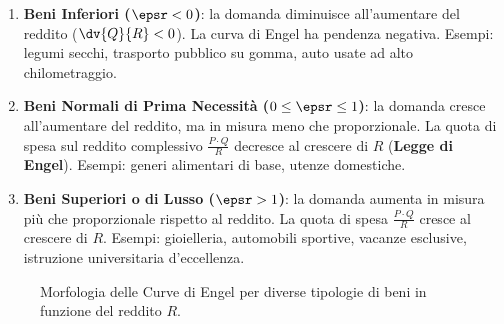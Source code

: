 \begin{enumerate}
    \item \textbf{Beni Inferiori ($\epsr < 0$)}: la domanda diminuisce all'aumentare del reddito ($\dv{Q}{R} < 0$). La curva di Engel ha pendenza negativa. Esempi: legumi secchi, trasporto pubblico su gomma, auto usate ad alto chilometraggio.
    \item \textbf{Beni Normali di Prima Necessità ($0 \le \epsr \le 1$)}: la domanda cresce all'aumentare del reddito, ma in misura meno che proporzionale. La quota di spesa sul reddito complessivo $\frac{P \cdot Q}{R}$ decresce al crescere di $R$ (\textbf{Legge di Engel}). Esempi: generi alimentari di base, utenze domestiche.
    \item \textbf{Beni Superiori o di Lusso ($\epsr > 1$)}: la domanda aumenta in misura più che proporzionale rispetto al reddito. La quota di spesa $\frac{P \cdot Q}{R}$ cresce al crescere di $R$. Esempi: gioielleria, automobili sportive, vacanze esclusive, istruzione universitaria d'eccellenza.
\end{enumerate}

\begin{figure}[htbp]
\centering
{}
\caption{Morfologia delle Curve di Engel per diverse tipologie di beni in funzione del reddito $R$.}
\label{fig:curve_engel}
\end{figure}

